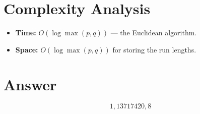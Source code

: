 \documentclass[11pt]{article}
\begin{document}
\section{Complexity Analysis}

\begin{itemize}
    \item \textbf{Time:} $O(\log \max(p, q))$ --- the Euclidean algorithm.
    \item \textbf{Space:} $O(\log \max(p, q))$ for storing the run lengths.
\end{itemize}

\section{Answer}

\[
\boxed{1,13717420,8}
\]
\end{document}
